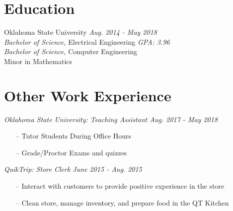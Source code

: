 \documentclass[line,overlapped,9pt]{res}
\begin{document}
\begin{resume}
      \section{Education} Oklahoma State University \hfill {\sl Aug. 2014 - May 2018} \\
            {\sl Bachelor of Science,} Electrical Engineering \hfill {\sl GPA: 3.96}\\
            {\sl Bachelor of Science,} Computer Engineering \\
            Minor in Mathematics 
                
    \section{Other Work Experience}

            {\sl Oklahoma State University: Teaching Assistant \hfill Aug. 2017 - May 2018}
            \begin{itemize}  \itemsep -2pt %
            \item[--] Tutor Students During Office Hours 
            \item[--] Grade/Proctor Exams and quizzes
            \end{itemize} 

            {\sl QuikTrip: Store Clerk \hfill June 2015 - Aug. 2015}
            \begin{itemize} \itemsep -2pt
            \item[--] Interact with customers to provide positive experience in the store 
            \item[--] Clean store, manage inventory, and prepare food in the QT Kitchen 
            \end{itemize}


\end{resume}
\end{document}
